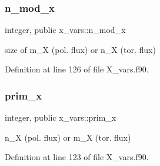 \subsubsection{\texorpdfstring{n\+\_\+mod\+\_\+x}{n\_mod\_x}}
{\footnotesize\ttfamily integer, public x\+\_\+vars\+::n\+\_\+mod\+\_\+x}



size of {\ttfamily m\+\_\+X} (pol. flux) or {\ttfamily n\+\_\+X} (tor. flux) 



Definition at line 126 of file X\+\_\+vars.\+f90.

\mbox{\label{namespacex__vars_ae7f7061534fb3ad68a538cdcea20d1d9}} 
\subsubsection{\texorpdfstring{prim\+\_\+x}{prim\_x}}
{\footnotesize\ttfamily integer, public x\+\_\+vars\+::prim\+\_\+x}



{\ttfamily n\+\_\+X} (pol. flux) or {\ttfamily m\+\_\+X} (tor. flux) 



Definition at line 123 of file X\+\_\+vars.\+f90.

